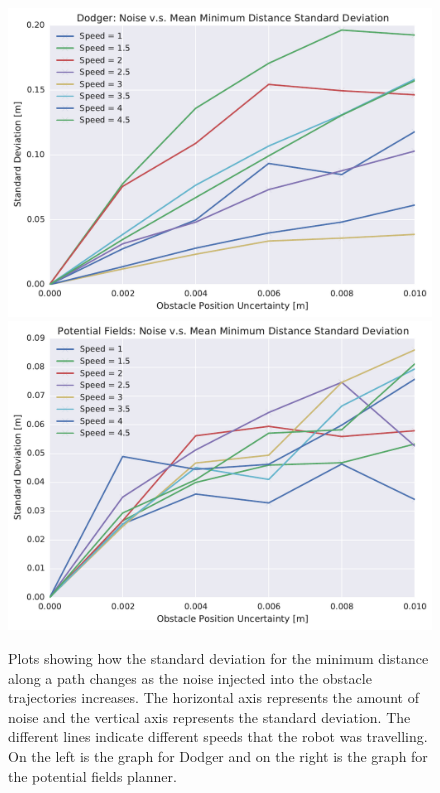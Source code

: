 \begin{figure}[h!]
    \centering

    \includegraphics[width=0.48\linewidth]{figs/planner_std_min_distance_2}
    \includegraphics[width=0.48\linewidth]{figs/pf_std_min_distance_2}

    \caption{Plots showing how the standard deviation for the minimum distance
        along a path changes as the noise injected into the obstacle
        trajectories increases. The horizontal axis represents the amount of
        noise and the vertical axis represents the standard deviation. The
        different lines indicate different speeds that the robot was
    travelling. On the left is the graph for Dodger and on the right is the
graph for the potential fields planner.}

\end{figure}

